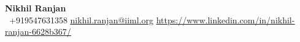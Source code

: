 \begin{center}
    \textbf{\huge Nikhil Ranjan} \\ \vspace{-2pt}
     \ \small +919547631358 \quad
    \href{mailto:nikhil.ranjan@iiml.org}{ \underline{nikhil.ranjan@iiml.org}} \quad
    \href{https://www.linkedin.com/in/nikhil-ranjan-6628b367/}{ \underline{https://www.linkedin.com/in/nikhil-ranjan-6628b367/}} 
\end{center}
\vspace{-22pt}